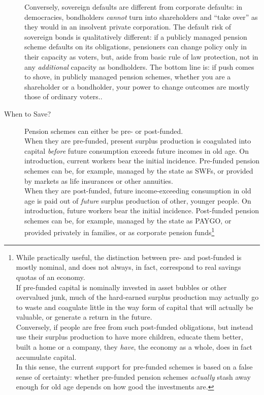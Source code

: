 \documentclass[11pt,a4paper,oneside,openright]{article}
\begin{document}
\begin{description}
{		Conversely, sovereign defaults are different from corporate defaults: 
		in democracies, bondholders \emph{cannot} turn into shareholders and ``take over'' as they would in an insolvent private corporation. 
		The default risk of sovereign bonds is qualitatively different: 
		if a publicly managed pension scheme defaults on its obligations, pensioners can change policy only in their capacity as voters, but, aside from basic rule of law protection, not in any \emph{additional} capacity as bondholders. 
		The bottom line is: 
		if push comes to shove, in publicly managed pension schemes, whether you are a shareholder or a bondholder, your power to change outcomes are mostly those of ordinary voters.}.
	\item[When to Save?] Pension schemes can either be pre- or post-funded. \\
	When they are pre-funded, present surplus production is coagulated into capital \emph{before} future consumption exceeds future incomes in old age. 
	On introduction, current workers bear the initial incidence. 
	Pre-funded pension schemes can be, for example, managed by the state as \glspl{SWF}, or provided by markets as life insurances or other annuities.\\
	When they are post-funded, future income-exceeding consumption in old age is paid out of \emph{future} surplus production of other, younger people. 
	On introduction, future workers bear the initial incidence. 
	Post-funded pension schemes can be, for example, managed by the state as PAYGO, or provided privately in families, or as corporate pension funds\footnote{
		While practically useful, the distinction between pre- and post-funded is mostly nominal, and does not always, in fact, correspond to real savings quotas of an economy. 
		\\
		If pre-funded capital is nominally invested in asset bubbles or other overvalued junk, much of the hard-earned surplus production may actually go to waste and coagulate little in the way form of capital that will actually be valuable, or generate a return in the future. 
		\\
		Conversely, if people are free from such post-funded obligations, but instead use their surplus production to have more children, educate them better, built a home or a company, they \emph{have}, the economy as a whole, does in fact accumulate capital. 
		\\
		In this sense, the current support for pre-funded schemes is based on a false sense of certainty: 
		whether pre-funded pension schemes \emph{actually} stash away enough for old age depends on how good the investments are. 
}
\end{description}
\end{document}
